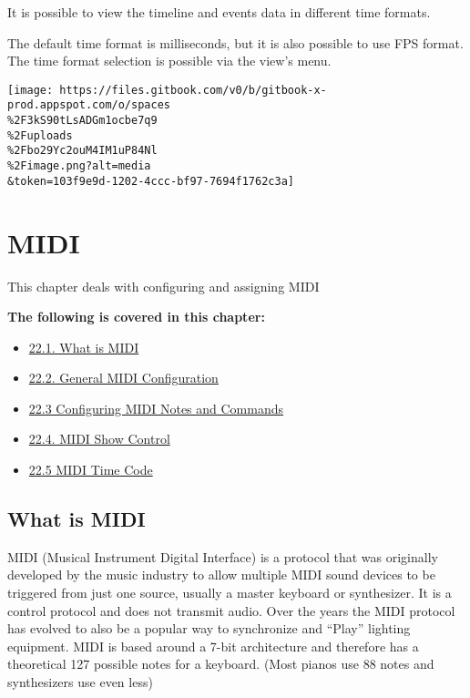 \documentclass[
]{article}
\providecommand{\tightlist}{%
  \setlength{\itemsep}{0pt}\setlength{\parskip}{0pt}}
\begin{document}
It is possible to view the timeline and events data in different time
formats.

The default time format is milliseconds, but it is also possible to use FPS format. The time format selection is possible via the view's menu.

\texttt{[image: https://files.gitbook.com/v0/b/gitbook-x-prod.appspot.com/o/spaces\\\%2F3kS90tLsADGm1ocbe7q9\\\%2Fuploads\\\%2Fbo29Yc2ouM4IM1uP84Nl\\\%2Fimage.png?alt=media\\\&token=103f9e9d-1202-4ccc-bf97-7694f1762c3a]}

\hypertarget{midi}{%
\section{MIDI}\label{midi}}

This chapter deals with configuring and assigning MIDI

\textbf{The following is covered in this chapter:}

\begin{itemize}
\tightlist
\item
  \href{https://vibemanual.compulite.com/working-with-midi.html\#what-is-midi}{22.1. What is MIDI}
\item
  \href{https://vibemanual.compulite.com/working-with-midi.html\#general-midi-configuration}{22.2. General MIDI Configuration}
\item
  \href{https://vibemanual.compulite.com/working-with-midi.html\#configuring-midi-notes-and-commands}{22.3 Configuring MIDI Notes and Commands}
\item
  \href{https://vibemanual.compulite.com/working-with-midi.html\#midi-show-control}{22.4. MIDI Show Control}
\item
  \href{https://vibemanual.compulite.com/working-with-midi.html\#midi-time-code}{22.5 MIDI Time Code}
\end{itemize}

\hypertarget{what-is-midi}{%
\subsection{What is MIDI}\label{what-is-midi}}

MIDI (Musical Instrument Digital Interface) is a protocol that was originally developed by the music industry to allow multiple MIDI sound devices to be triggered from just one source, usually a master keyboard or synthesizer. It is a control protocol and does not transmit audio. Over the years the MIDI protocol has evolved to also be a popular way to synchronize and ``Play'' lighting equipment. MIDI is based around a 7-bit architecture and therefore has a theoretical 127 possible notes for a keyboard. (Most pianos use 88 notes and synthesizers use even less)
\end{document}
